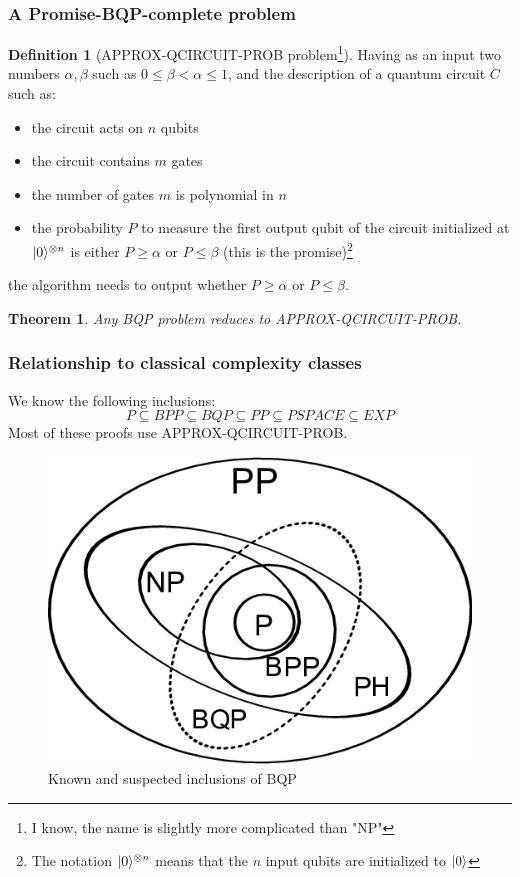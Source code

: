 \documentclass[12pt,a4paper]{article}
\theoremstyle{plain}
\newtheorem*{theorem}{Theorem}
\theoremstyle{definition}
\newtheorem*{definition}{Definition}
\DeclarePairedDelimiter\ket{\lvert}{\rangle}
\begin{document}
\subsubsection{A Promise-BQP-complete problem}
\begin{definition}[APPROX-QCIRCUIT-PROB problem\footnote{I know, the name is slightly more complicated than "NP"}]
    Having as an input two numbers $\alpha, \beta$ such as $0\leq\beta<\alpha\leq 1$, and the description of a quantum circuit $C$ such as:
    \begin{itemize}[label=--, noitemsep]
        \item the circuit acts on $n$ qubits
        \item the circuit contains $m$ gates
        \item the number of gates $m$ is polynomial in $n$
        \item the probability $P$ to measure the first output qubit of the circuit initialized at $\ket{0}^{\otimes n}$ is either $P\geq\alpha$ or $P\leq\beta$ (this is the promise)\footnote{The notation $\ket{0}^{\otimes n}$ means that the $n$ input qubits are initialized to $\ket{0}$}
    \end{itemize}
    the algorithm needs to output whether $P\geq\alpha$ or $P\leq\beta$.
\end{definition}

\begin{theorem}
    Any BQP problem reduces to APPROX-QCIRCUIT-PROB.
\end{theorem}

\subsubsection{Relationship to classical complexity classes}
We know the following inclusions:
\begin{equation*}
    P \subseteq BPP \subseteq BQP \subseteq PP \subseteq PSPACE \subseteq EXP
\end{equation*}
Most of these proofs use APPROX-QCIRCUIT-PROB.

\begin{figure}[!ht]
    \centering
    \includegraphics*[scale=0.35]{bqp-inclusions.png}
    \caption{Known and suspected inclusions of BQP}
\end{figure}
\end{document}
